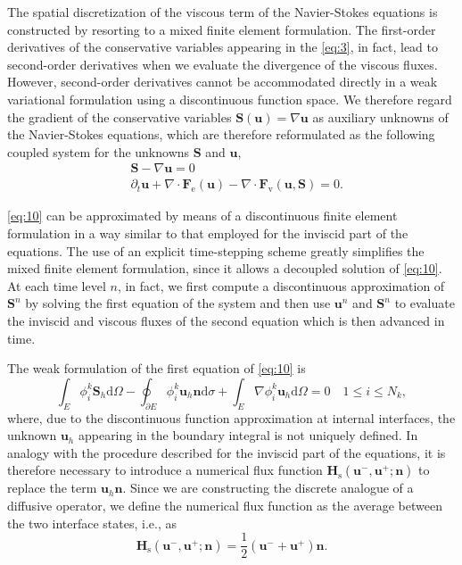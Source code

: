 \documentclass{develop-note}
\begin{document}
The spatial discretization of the viscous term of the Navier-Stokes equations is constructed by resorting to a mixed finite element formulation. The first-order derivatives of the conservative variables appearing in the \autoref{eq:3}, in fact, lead to second-order derivatives when we evaluate the divergence of the viscous fluxes. However, second-order derivatives cannot be accommodated directly in a weak variational formulation using a discontinuous function space. We therefore regard the gradient of the conservative variables $\mathbf{S}(\mathbf{u})=\nabla\mathbf{u}$ as auxiliary unknowns of the Navier-Stokes equations, which are therefore reformulated as the following coupled system for the unknowns $\mathbf{S}$ and $\mathbf{u}$,
\begin{equation}
  \label{eq:10}
  \begin{aligned}
    &\mathbf{S}-\nabla\mathbf{u}=0\\
    &\partial_{t}\mathbf{u}+\nabla\cdot\mathbf{F}_{\mathrm{e}}(\mathbf{u})-\nabla\cdot\mathbf{F}_{\mathrm{v}}(\mathbf{u},\mathbf{S})=0.
  \end{aligned}
\end{equation}

\autoref{eq:10} can be approximated by means of a discontinuous finite element formulation in a way similar to that employed for the inviscid part of the equations. The use of an explicit time-stepping scheme greatly simplifies the mixed finite element formulation, since it allows a decoupled solution of \autoref{eq:10}. At each time level $n$, in fact, we first compute a discontinuous approximation of $\mathbf{S}^{n}$ by solving the first equation of the system and then use $\mathbf{u}^{n}$ and $\mathbf{S}^{n}$ to evaluate the inviscid and viscous fluxes of the second equation which is then advanced in time.

The weak formulation of the first equation of \autoref{eq:10} is
\begin{equation}
  \label{eq:11}
  \int_{E}\phi_{i}^{k}\mathbf{S}_{h}\mathrm{d}\Omega-\oint_{\partial E}\phi_{i}^{k}\mathbf{u}_{h}\mathbf{n}\mathrm{d}\sigma+\int_{E}\nabla\phi_{i}^{k}\mathbf{u}_{h}\mathrm{d}\Omega=0\quad 1\leqslant i\leqslant N_{k},
\end{equation}
where, due to the discontinuous function approximation at internal interfaces, the unknown $\mathbf{u}_{h}$ appearing in the boundary integral is not uniquely defined. In analogy with the procedure described for the inviscid part of the equations, it is therefore necessary to introduce a numerical flux function $\mathbf{H}_{\mathrm{s}}(\mathbf{u}^{-},\mathbf{u}^{+};\mathbf{n})$ to replace the term $\mathbf{u}_{h}\mathbf{n}$. Since we are constructing the discrete analogue of a diffusive operator, we define the numerical flux function as the average between the two interface states, i.e., as
\begin{equation}
  \label{eq:12}
  \mathbf{H}_{\mathrm{s}}(\mathbf{u}^{-},\mathbf{u}^{+};\mathbf{n})=\dfrac{1}{2}(\mathbf{u}^{-}+\mathbf{u}^{+})\mathbf{n}.
\end{equation}
\end{document}

